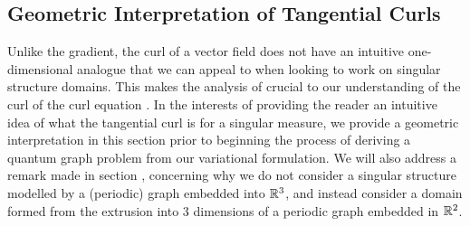 \subsection{Geometric Interpretation of Tangential Curls} \label{ssec:CC-Geometric}
Unlike the gradient, the curl of a vector field does not have an intuitive one-dimensional analogue that we can appeal to when looking to work on singular structure domains.
This makes the analysis of  crucial to our understanding of the curl of the curl equation .
In the interests of providing the reader an intuitive idea of what the tangential curl is for a singular measure, we provide a geometric interpretation in this section prior to beginning the process of deriving a quantum graph problem from our variational formulation.
We will also address a remark made in section , concerning why we do not consider a singular structure modelled by a (periodic) graph embedded into $\mathbb{R}^3$, and instead consider a domain formed from the extrusion into 3 dimensions of a periodic graph embedded in $\mathbb{R}^2$.

